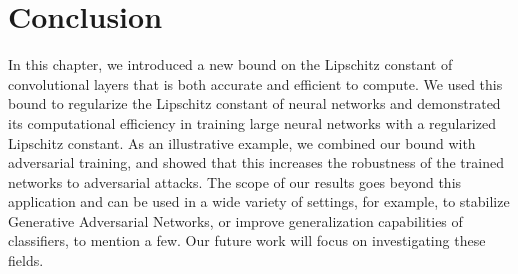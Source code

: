 \section{Conclusion}
\label{section:ch4-conclusion}

In this chapter, we introduced a new bound on the Lipschitz constant of convolutional layers that is both accurate and efficient to compute.
We used this bound to regularize the Lipschitz constant of neural networks and demonstrated its computational efficiency in training large neural networks with a regularized Lipschitz constant.
As an illustrative example, we   combined our bound with adversarial training, and showed that this increases the robustness of the trained networks to  adversarial attacks.
The scope of our results goes beyond this application and can be used  in a wide variety of settings, for example, to stabilize Generative Adversarial Networks, or improve generalization capabilities of classifiers, to mention a few.
Our future work will focus on investigating these fields. 






